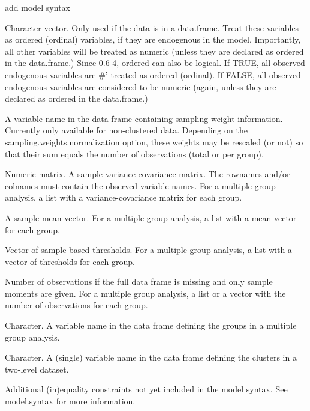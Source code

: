 \documentclass[a4paper]{book}
\begin{document}
\begin{Arguments}
\begin{ldescription}
\item[\code{add\_model}] add model syntax

\item[\code{ordered}] Character vector. Only used if the data is in a data.frame.
Treat these variables as ordered (ordinal) variables, if they are endogenous
in the model. Importantly, all other variables will be treated as numeric
(unless they are declared as ordered in the data.frame.) Since 0.6-4,
ordered can also be logical. If TRUE, all observed endogenous variables are
\#'    treated as ordered (ordinal). If FALSE, all observed endogenous variables
are considered to be numeric (again, unless they are declared as ordered
in the data.frame.)

\item[\code{sampling.weights}] A variable name in the data frame containing sampling
weight information. Currently only available for non-clustered data.
Depending on the sampling.weights.normalization option, these weights may be
rescaled (or not) so that their sum equals the number of observations
(total or per group).

\item[\code{sample.cov}] Numeric matrix. A sample variance-covariance matrix.
The rownames and/or colnames must contain the observed variable names.
For a multiple group analysis, a list with a variance-covariance matrix
for each group.

\item[\code{sample.mean}] A sample mean vector. For a multiple group analysis,
a list with a mean vector for each group.

\item[\code{sample.th}] Vector of sample-based thresholds.
For a multiple group analysis, a list with a vector of thresholds for each group.

\item[\code{sample.nobs}] Number of observations if the full data frame is missing and
only sample moments are given. For a multiple group analysis, a list or a vector
with the number of observations for each group.

\item[\code{group}] Character. A variable name in the data frame defining
the groups in a multiple group analysis.

\item[\code{cluster}] Character. A (single) variable name in the data frame defining
the clusters in a two-level dataset.

\item[\code{constraints}] Additional (in)equality constraints not yet included
in the model syntax. See model.syntax for more information.


\end{ldescription}
\end{Arguments}
\end{document}
